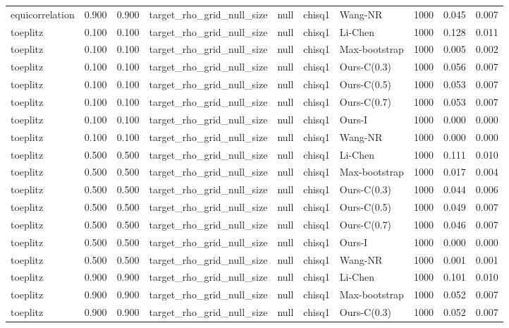 \begin{tabular}{lrrllllrrr}
equicorrelation & 0.900 & 0.900 & target\_rho\_grid\_null\_size & null & chisq1 & Wang-NR & 1000 & 0.045 & 0.007 \\
toeplitz & 0.100 & 0.100 & target\_rho\_grid\_null\_size & null & chisq1 & Li-Chen & 1000 & 0.128 & 0.011 \\
toeplitz & 0.100 & 0.100 & target\_rho\_grid\_null\_size & null & chisq1 & Max-bootstrap & 1000 & 0.005 & 0.002 \\
toeplitz & 0.100 & 0.100 & target\_rho\_grid\_null\_size & null & chisq1 & Ours-C(0.3) & 1000 & 0.056 & 0.007 \\
toeplitz & 0.100 & 0.100 & target\_rho\_grid\_null\_size & null & chisq1 & Ours-C(0.5) & 1000 & 0.053 & 0.007 \\
toeplitz & 0.100 & 0.100 & target\_rho\_grid\_null\_size & null & chisq1 & Ours-C(0.7) & 1000 & 0.053 & 0.007 \\
toeplitz & 0.100 & 0.100 & target\_rho\_grid\_null\_size & null & chisq1 & Ours-I & 1000 & 0.000 & 0.000 \\
toeplitz & 0.100 & 0.100 & target\_rho\_grid\_null\_size & null & chisq1 & Wang-NR & 1000 & 0.000 & 0.000 \\
toeplitz & 0.500 & 0.500 & target\_rho\_grid\_null\_size & null & chisq1 & Li-Chen & 1000 & 0.111 & 0.010 \\
toeplitz & 0.500 & 0.500 & target\_rho\_grid\_null\_size & null & chisq1 & Max-bootstrap & 1000 & 0.017 & 0.004 \\
toeplitz & 0.500 & 0.500 & target\_rho\_grid\_null\_size & null & chisq1 & Ours-C(0.3) & 1000 & 0.044 & 0.006 \\
toeplitz & 0.500 & 0.500 & target\_rho\_grid\_null\_size & null & chisq1 & Ours-C(0.5) & 1000 & 0.049 & 0.007 \\
toeplitz & 0.500 & 0.500 & target\_rho\_grid\_null\_size & null & chisq1 & Ours-C(0.7) & 1000 & 0.046 & 0.007 \\
toeplitz & 0.500 & 0.500 & target\_rho\_grid\_null\_size & null & chisq1 & Ours-I & 1000 & 0.000 & 0.000 \\
toeplitz & 0.500 & 0.500 & target\_rho\_grid\_null\_size & null & chisq1 & Wang-NR & 1000 & 0.001 & 0.001 \\
toeplitz & 0.900 & 0.900 & target\_rho\_grid\_null\_size & null & chisq1 & Li-Chen & 1000 & 0.101 & 0.010 \\
toeplitz & 0.900 & 0.900 & target\_rho\_grid\_null\_size & null & chisq1 & Max-bootstrap & 1000 & 0.052 & 0.007 \\
toeplitz & 0.900 & 0.900 & target\_rho\_grid\_null\_size & null & chisq1 & Ours-C(0.3) & 1000 & 0.052 & 0.007 \\

\end{tabular}
